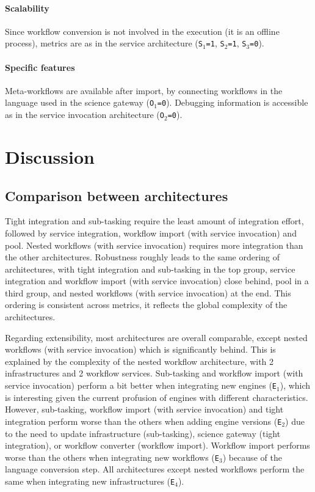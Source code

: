 \documentclass[preprint,3p,twocolumn]{elsarticle}
\newcommand{\note}[2]{\pdfmargincomment[color=yellow,author=#1,open=true]{#2}}
\begin{document}
\paragraph{Scalability}  Since workflow conversion is not involved in
the execution (it is an offline process), metrics are as in the
service architecture (\texttt{S$_1$=1},
\texttt{S$_2$=1}, \texttt{S$_3$=0}).

\paragraph{Specific features} Meta-workflows are available after import,
by connecting workflows in the language used in the science gateway
(\texttt{O$_1$=0}). Debugging information is accessible as in the
service invocation architecture (\texttt{O$_2$=0}).

\section{Discussion}

\subsection{Comparison between architectures}

Tight integration and sub-tasking require the least amount of
integration effort, followed by service integration, workflow import
(with service invocation) and pool. Nested workflows (with service
invocation) requires more integration than the other
architectures. Robustness roughly leads to the same ordering of
architectures, with tight integration and sub-tasking in the top
group, service integration and workflow import (with service
invocation) close behind, pool in a third group, and nested workflows
(with service invocation) at the end. This ordering is consistent
across metrics, it reflects the global complexity of the
architectures.

Regarding extensibility, most architectures are overall comparable,
except nested workflows (with service invocation) which is
significantly behind. This is explained by the complexity of the
nested workflow architecture, with 2 infrastructures and 2 workflow
services. Sub-tasking and workflow import (with service invocation)
perform a bit better when integrating new engines (\texttt{E$_1$}),
which is interesting given the current profusion of engines with
different characteristics.  However, sub-tasking, workflow import
(with service invocation) and tight integration perform worse than the
others when adding engine versions (\texttt{E$_2$}) due to the need to
update infrastructure \note{Marc-e}{confusion with
  physical?}(sub-tasking), science gateway (tight integration), or
workflow converter (workflow import). Workflow import performs worse
than the others when integrating new workflows (\texttt{E$_3$})
because of the language conversion step. All architectures except
nested workflows perform the same when integrating new infrastructures
(\texttt{E$_4$}).
\end{document}
